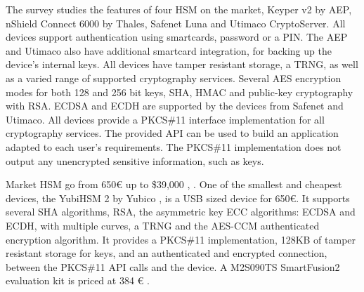 The survey \cite{ivarsson2010review} studies the features of four \ac{HSM} on the market, Keyper v2 by AEP, nShield Connect 6000 by Thales, Safenet Luna and Utimaco CryptoServer.
All devices support authentication using smartcards, password or a PIN. The AEP and Utimaco also have additional smartcard integration, for backing up the device's internal keys.
All devices have tamper resistant storage, a \ac{TRNG}, as well as a varied range of supported cryptography services. Several AES encryption modes for both 128 and 256 bit keys, SHA, HMAC and public-key cryptography with RSA.
ECDSA and ECDH are supported by the devices from Safenet and Utimaco.
All devices provide a PKCS\#11 interface implementation for all cryptography services. The provided API can be used to build an application adapted to each user's requirements. The PKCS\#11 implementation does not output any unencrypted sensitive information, such as keys.

Market \ac{HSM} go from 650€ up to \$39,000 \cite{HSMpriceArticles}, \cite{HSMPresentationPrices}.
One of the smallest and cheapest devices, the YubiHSM 2 by Yubico \cite{YubiHSM2}, is a \ac{USB} sized device for 650€. It supports several SHA algorithms, RSA, the asymmetric key ECC algorithms: ECDSA and ECDH, with multiple curves, a \ac{TRNG} and the \ac{AES}-\ac{CCM} authenticated encryption algorithm.
It provides a PKCS\#11 implementation, 128KB of tamper resistant storage for keys, and an authenticated and encrypted connection, between the PKCS\#11 API calls and the device.
A M2S090TS SmartFusion2 evaluation kit is priced at 384 € \cite{smartfusionPrice}.
